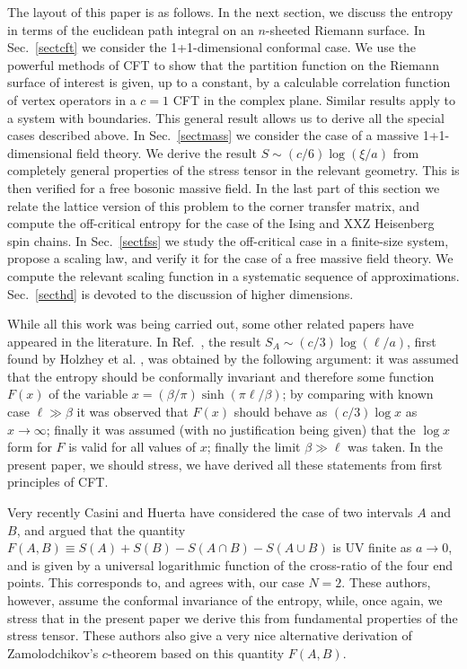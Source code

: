 \documentclass[12pt,aps,nofootinbib]{revtex4-1}
\begin{document}
The layout of this paper is as follows. In the next section, we discuss
the entropy in terms of the euclidean path integral on an $n$-sheeted
Riemann surface. In Sec.~\ref{sectcft} we consider the 1+1-dimensional
conformal case. We use the powerful methods of CFT
to show that the partition function on the Riemann surface of interest
is given, up to a constant, by a calculable correlation function of
vertex operators in a $c=1$ CFT in the complex plane. Similar results
apply to a system with boundaries. This general result allows us to
derive all the special cases described above. In Sec.~\ref{sectmass} we
consider the case of a massive 1+1-dimensional field theory. We derive
the result $S\sim(c/6)\log(\xi/a)$ from completely general properties of
the stress tensor in the relevant geometry. This is then verified for a
free bosonic massive field.
In the last part of this section we relate the
lattice version of this problem to the corner transfer matrix, and
compute the off-critical entropy for the case of the Ising and
XXZ Heisenberg spin chains.
In Sec.~\ref{sectfss} we study the off-critical case in a finite-size
system, propose a scaling law, and verify it for the case of a free
massive field theory. We compute the relevant scaling function in a
systematic sequence of approximations.
Sec.~\ref{secthd} is devoted to the discussion of higher dimensions.

While all this work was being carried out, some other related papers
have appeared in the literature. In Ref.~\cite{Korepin2}, the
result $S_A\sim(c/3)\log(\ell/a)$, first found by Holzhey et
al. \cite{Holzhey},
was obtained by the following argument: it was assumed
that the entropy should be conformally invariant and therefore some
function $F(x)$ of the variable $x=(\beta/\pi)\sinh(\pi\ell/\beta)$;
by comparing with known case $\ell\gg\beta$ \cite{BCN,Affleck} it was
observed that $F(x)$ should behave as $(c/3)\log x$ as $x\to\infty$;
finally it was assumed (with no justification being given) that the
$\log x$ form for $F$ is valid for all values of $x$; finally
the limit $\beta\gg\ell$ was taken. In the present paper, we should
stress, we have derived all these statements from first principles of
CFT.

Very recently Casini and Huerta \cite{Casini} have considered the case
of two intervals $A$ and $B$, and argued that the quantity
$F(A,B)\equiv S(A)+S(B)-S(A\cap B)-S(A\cup B)$ is UV finite as $a\to0$,
and is given by a universal logarithmic function of the cross-ratio
of the four end points. This corresponds to, and agrees with, our case $N=2$.
These authors, however, assume the conformal invariance of the entropy,
while, once again, we stress that in the present paper we derive this from
fundamental
properties of the stress tensor. These authors also give a very nice
alternative derivation of Zamolodchikov's $c$-theorem \cite{Zam} based on
this quantity $F(A,B)$.
\end{document}
